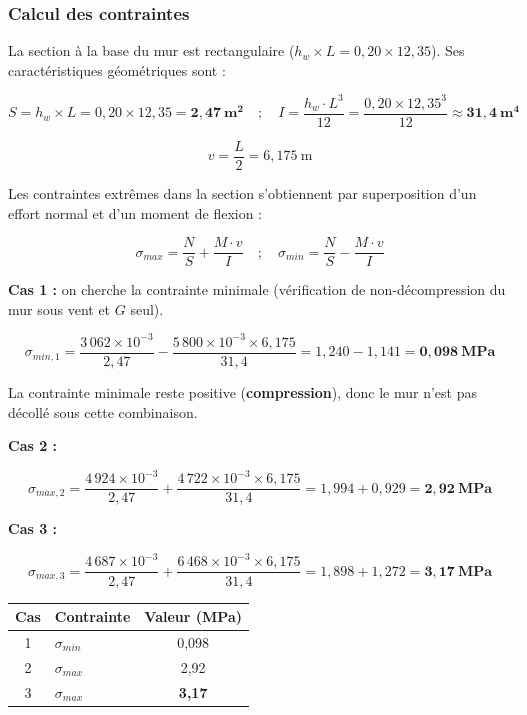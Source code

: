 \subsubsection{Calcul des contraintes}

La section à la base du mur est rectangulaire ($h_w \times L = 0{,}20 \times 12{,}35$). Ses caractéristiques géométriques sont :

\[
S = h_w \times L = 0{,}20 \times 12{,}35 = \mathbf{2{,}47~\text{m}^2}
\quad ; \quad
I = \frac{h_w \cdot L^3}{12} = \frac{0{,}20 \times 12{,}35^3}{12} \approx \mathbf{31{,}4~\text{m}^4}
\]

\[
v = \frac{L}{2} = 6{,}175~\text{m}
\]

Les contraintes extrêmes dans la section s'obtiennent par superposition d'un effort normal et d'un moment de flexion :

\[
\sigma_{max} = \frac{N}{S} + \frac{M \cdot v}{I}
\quad ; \quad
\sigma_{min} = \frac{N}{S} - \frac{M \cdot v}{I}
\]

\textbf{Cas 1 :} on cherche la contrainte minimale (vérification de non-décompression du mur sous vent et $G$ seul).

\[
\sigma_{min,1} = \frac{3\,062 \times 10^{-3}}{2{,}47} - \frac{5\,800 \times 10^{-3} \times 6{,}175}{31{,}4} = 1{,}240 - 1{,}141 = \mathbf{0{,}098~\text{MPa}}
\]

La contrainte minimale reste positive (\textbf{compression}), donc le mur n'est pas décollé sous cette combinaison.

\textbf{Cas 2 :}

\[
\sigma_{max,2} = \frac{4\,924 \times 10^{-3}}{2{,}47} + \frac{4\,722 \times 10^{-3} \times 6{,}175}{31{,}4} = 1{,}994 + 0{,}929 = \mathbf{2{,}92~\text{MPa}}
\]

\textbf{Cas 3 :}

\[
\sigma_{max,3} = \frac{4\,687 \times 10^{-3}}{2{,}47} + \frac{6\,468 \times 10^{-3} \times 6{,}175}{31{,}4} = 1{,}898 + 1{,}272 = \mathbf{3{,}17~\text{MPa}}
\]

\begin{center}
\begin{tabularx}{0.6\linewidth}{cXc}
\toprule
\textbf{Cas} & \textbf{Contrainte} & \textbf{Valeur (MPa)} \\
\midrule
1 & $\sigma_{min}$ & 0{,}098 \\
2 & $\sigma_{max}$ & 2{,}92  \\
3 & $\sigma_{max}$ & \textbf{3{,}17} \\
\bottomrule
\end{tabularx}
\end{center}


